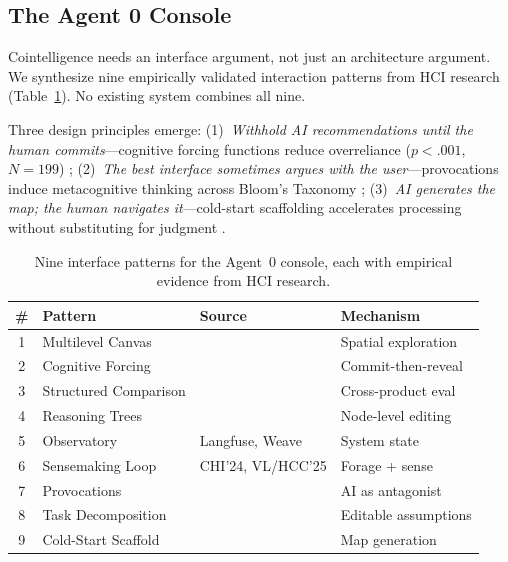 \documentclass{article}
\begin{document}
\subsection{The Agent 0 Console}
\label{sec:console}

Cointelligence needs an interface argument, not just an architecture
argument. We synthesize nine empirically validated interaction patterns
from HCI research (Table~\ref{tab:patterns}). No existing system
combines all nine.

Three design principles emerge: (1)~\emph{Withhold AI recommendations
until the human commits}---cognitive forcing functions reduce
overreliance ($p\!<\!.001$, $N\!=\!199$)
\cite{bucinca2021trust}; (2)~\emph{The best interface sometimes argues
with the user}---provocations induce metacognitive thinking across
Bloom's Taxonomy \cite{drosos2025provocations}; (3)~\emph{AI generates
the map; the human navigates it}---cold-start scaffolding accelerates
processing without substituting for judgment
\cite{liu2024selenite}.

\begin{table}[t]
\centering
\small
\begin{tabular}{clll}
\toprule
\textbf{\#} & \textbf{Pattern} & \textbf{Source} & \textbf{Mechanism} \\
\midrule
1 & Multilevel Canvas & \cite{suh2023sensecape,suh2024luminate} & Spatial exploration \\
2 & Cognitive Forcing & \cite{bucinca2021trust} & Commit-then-reveal \\
3 & Structured Comparison & \cite{arawjo2024chainforge} & Cross-product eval \\
4 & Reasoning Trees & \cite{pang2025hippo} & Node-level editing \\
5 & Observatory & Langfuse, Weave & System state \\
6 & Sensemaking Loop & CHI'24, VL/HCC'25 & Forage + sense \\
7 & Provocations & \cite{drosos2025provocations} & AI as antagonist \\
8 & Task Decomposition & \cite{kazemitabaar2024taskdecomp} & Editable assumptions \\
9 & Cold-Start Scaffold & \cite{liu2024selenite} & Map generation \\
\bottomrule
\end{tabular}
\caption{Nine interface patterns for the Agent~0 console, each with
empirical evidence from HCI research.}
\label{tab:patterns}
\end{table}
\end{document}
